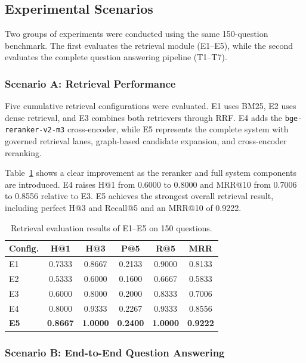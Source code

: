 \subsection{Experimental Scenarios}

Two groups of experiments were conducted using the same 150-question benchmark.
The first evaluates the retrieval module (E1--E5), while the second evaluates
the complete question answering pipeline (T1--T7).

\subsubsection{Scenario A: Retrieval Performance}

Five cumulative retrieval configurations were evaluated. E1 uses BM25, E2
uses dense retrieval, and E3 combines both retrievers through RRF. E4 adds the
\texttt{bge-reranker-v2-m3} cross-encoder, while E5 represents the complete
system with governed retrieval lanes, graph-based candidate expansion, and
cross-encoder reranking.

Table~\ref{tab:retrieval} shows a clear improvement as the reranker and full
system components are introduced. E4 raises H@1 from 0.6000 to 0.8000 and
MRR@10 from 0.7006 to 0.8556 relative to E3. E5 achieves the strongest overall
retrieval result, including perfect H@3 and Recall@5 and an MRR@10 of 0.9222.

\begin{table}[!ht]
\centering
\caption{Retrieval evaluation results of E1--E5 on 150 questions.}
\label{tab:retrieval}
\begin{tabular}{lccccc}
\toprule
Config. & H@1 & H@3 & P@5 & R@5 & MRR \\
\midrule
E1 & 0.7333 & 0.8667 & 0.2133 & 0.9000 & 0.8133 \\
E2 & 0.5333 & 0.6000 & 0.1600 & 0.6667 & 0.5833 \\
E3 & 0.6000 & 0.8000 & 0.2000 & 0.8333 & 0.7006 \\
E4 & 0.8000 & 0.9333 & 0.2267 & 0.9333 & 0.8556 \\
\textbf{E5} & \textbf{0.8667} & \textbf{1.0000} & \textbf{0.2400} & \textbf{1.0000} & \textbf{0.9222} \\
\bottomrule
\end{tabular}
\end{table}

\subsubsection{Scenario B: End-to-End Question Answering}

